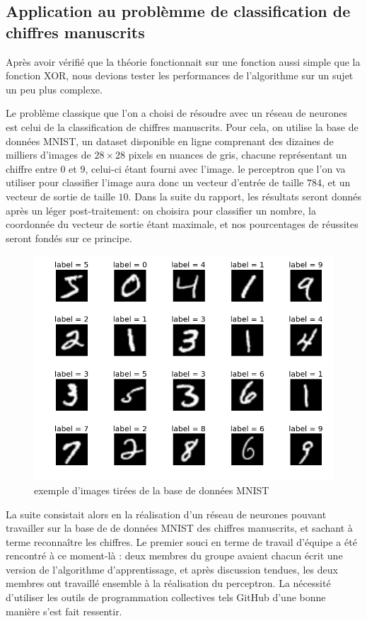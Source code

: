 \documentclass[
    10pt,
    a4paper,
    oneside,
    headinclude,footinclude,
    BCOR=5mm,
    captions=tableabove
]{scrartcl}
\begin{document}
\subsection{Application au problèmme de classification de chiffres manuscrits}

Après avoir vérifié que la théorie fonctionnait sur une fonction aussi simple que la fonction XOR, nous devions tester les performances de l'algorithme sur un sujet un peu plus complexe.

Le problème classique que l'on a choisi de résoudre avec un réseau de neurones est celui de la classification de chiffres manuscrits. Pour cela, on utilise la base de données MNIST, un dataset disponible en ligne comprenant des dizaines de milliers d'images de $28\times 28$ pixels en nuances de gris, chacune représentant un chiffre entre $0$ et $9$, celui-ci étant fourni avec l'image. le perceptron que l'on va utiliser pour classifier l'image aura donc un vecteur d'entrée de taille $784$, et un vecteur de sortie de taille $10$. Dans la suite du rapport, les résultats seront donnés après un léger post-traitement: on choisira pour classifier un nombre, la coordonnée du vecteur de sortie étant maximale, et nos pourcentages de réussites seront fondés sur ce principe.

\begin{figure}[h!]
\includegraphics[width=0.8 \linewidth]{MNIST.png}
\centering
\caption{exemple d'images tirées de la base de données MNIST}
\label{fig:MNIST}
\end{figure}

La suite consistait alors en la réalisation d'un réseau de neurones pouvant travailler sur la base de de données MNIST des chiffres manuscrits, et sachant à terme reconnaître les chiffres. Le premier souci en terme de travail d'équipe a été rencontré à ce moment-là : deux membres du groupe avaient chacun écrit une version de l'algorithme d'apprentissage, et après discussion tendues, les deux membres ont travaillé ensemble à la réalisation du perceptron. La nécessité d'utiliser les outils de programmation collectives tels GitHub d'une bonne manière s'est fait ressentir.
\end{document}
